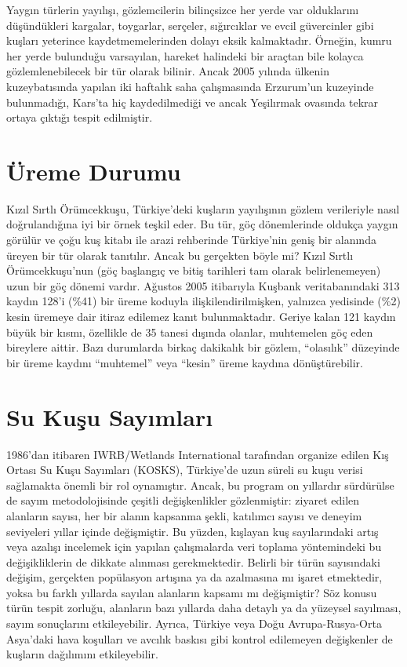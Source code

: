 \documentclass[
  a4paper,
  DIV=11,
  numbers=noendperiod]{scrartcl}
\begin{document}
Yaygın türlerin yayılışı, gözlemcilerin bilinçsizce her yerde var
olduklarını düşündükleri kargalar, toygarlar, serçeler, sığırcıklar ve
evcil güvercinler gibi kuşları yeterince kaydetmemelerinden dolayı eksik
kalmaktadır. Örneğin, kumru her yerde bulunduğu varsayılan, hareket
halindeki bir araçtan bile kolayca gözlemlenebilecek bir tür olarak
bilinir. Ancak 2005 yılında ülkenin kuzeybatısında yapılan iki haftalık
saha çalışmasında Erzurum'un kuzeyinde bulunmadığı, Kars'ta hiç
kaydedilmediği ve ancak Yeşilırmak ovasında tekrar ortaya çıktığı tespit
edilmiştir.

\section*{Üreme Durumu}\label{uxfcreme-durumu}


Kızıl Sırtlı Örümcekkuşu, Türkiye'deki kuşların yayılışının gözlem
verileriyle nasıl doğrulandığına iyi bir örnek teşkil eder. Bu tür, göç
dönemlerinde oldukça yaygın görülür ve çoğu kuş kitabı ile arazi
rehberinde Türkiye'nin geniş bir alanında üreyen bir tür olarak
tanıtılır. Ancak bu gerçekten böyle mi? Kızıl Sırtlı Örümcekkuşu'nun
(göç başlangıç ve bitiş tarihleri tam olarak belirlenemeyen) uzun bir
göç dönemi vardır. Ağustos 2005 itibarıyla Kuşbank veritabanındaki 313
kaydın 128'i (\%41) bir üreme koduyla ilişkilendirilmişken, yalnızca
yedisinde (\%2) kesin üremeye dair itiraz edilemez kanıt bulunmaktadır.
Geriye kalan 121 kaydın büyük bir kısmı, özellikle de 35 tanesi dışında
olanlar, muhtemelen göç eden bireylere aittir. Bazı durumlarda birkaç
dakikalık bir gözlem, ``olasılık'' düzeyinde bir üreme kaydını
``muhtemel'' veya ``kesin'' üreme kaydına dönüştürebilir.

\section*{Su Kuşu Sayımları}\label{su-kuux15fu-sayux131mlarux131}


1986'dan itibaren IWRB/Wetlands International tarafından organize edilen
Kış Ortası Su Kuşu Sayımları (KOSKS), Türkiye'de uzun süreli su kuşu
verisi sağlamakta önemli bir rol oynamıştır. Ancak, bu program on
yıllardır sürdürülse de sayım metodolojisinde çeşitli değişkenlikler
gözlenmiştir: ziyaret edilen alanların sayısı, her bir alanın kapsanma
şekli, katılımcı sayısı ve deneyim seviyeleri yıllar içinde değişmiştir.
Bu yüzden, kışlayan kuş sayılarındaki artış veya azalışı incelemek için
yapılan çalışmalarda veri toplama yöntemindeki bu değişikliklerin de
dikkate alınması gerekmektedir. Belirli bir türün sayısındaki değişim,
gerçekten popülasyon artışına ya da azalmasına mı işaret etmektedir,
yoksa bu farklı yıllarda sayılan alanların kapsamı mı değişmiştir? Söz
konusu türün tespit zorluğu, alanların bazı yıllarda daha detaylı ya da
yüzeysel sayılması, sayım sonuçlarını etkileyebilir. Ayrıca, Türkiye
veya Doğu Avrupa-Rusya-Orta Asya'daki hava koşulları ve avcılık baskısı
gibi kontrol edilemeyen değişkenler de kuşların dağılımını
etkileyebilir.
\end{document}
